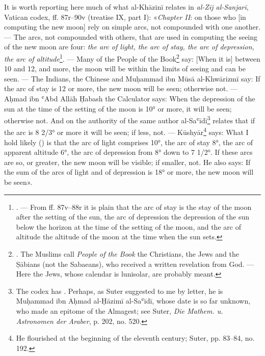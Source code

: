 \documentclass[11pt]{article}
\begin{document}
\par It is worth reporting here much of what al-Khāzinī relates in \emph{al-Zīj al-Sanjarī}, Vatican codex, ff. 87r–90v (treatise IX, part I): «\emph{Chapter II}: on those who [in computing the new moon] rely on simple arcs, not compounded with one another. — The arcs, not compounded with others, that are used in computing the seeing of the new moon are four: \emph{the arc of light, the arc of stay, the arc of depression, the arc of altitude}\footnote{. — From ff. 87v–88r it is plain that the arc of stay is the stay of the moon after the setting of the sun, the arc of depression the depression of the sun below the horizon at the time of the setting of the moon, and the arc of altitude the altitude of the moon at the time when the sun sets.}. — Many of the People of the Book\footnote{. The Muslims call \emph{People of the Book} the Christians, the Jews and the Ṣābians (not the Sabaeans), who received a written revelation from God. — Here the Jews, whose calendar is lunisolar, are probably meant.} say: [When it is] between 10 and 12, and more, the moon will be within the limits of seeing and can be seen. — The Indians, the Chinese and Muḥammad ibn Mūsā al-Khwārizmī say: If the arc of stay is 12 or more, the new moon will be seen; otherwise not. — Aḥmad ibn ʿAbd Allāh Ḥabash the Calculator says: When the depression of the sun at the time of the setting of the moon is 10° or more, it will be seen; otherwise not. And on the authority of the same author al-Saʿīdī\footnote{The codex has . Perhaps, as Suter suggested to me by letter, he is Muḥammad ibn Aḥmad al-Ḥāzimī al-Saʿīdī, whose date is so far unknown, who made an epitome of the Almagest; see Suter, \emph{Die Mathem. u. Astronomen der Araber}, p. 202, no. 520.} relates that if the arc is 8 2/3° or more it will be seen; if less, not. — Kūshyār\footnote{He flourished at the beginning of the eleventh century; Suter, pp. 83–84, no. 192.} says: What I hold likely () is that the arc of light comprises 10°, the arc of stay 8°, the arc of apparent altitude 6°, the arc of depression from 8° down to 7 1/2°. If these arcs are so, or greater, the new moon will be visible; if smaller, not. He also says: If the sum of the arcs of light and of depression is 18° or more, the new moon will be seen».\par
\end{document}
